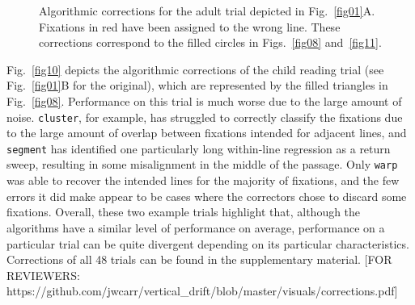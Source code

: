 \documentclass[doc,biblatex]{apa7}
\begin{document}
	\begin{figure}
	\vspace*{2pt}
	\caption{Algorithmic corrections for the adult trial depicted in Fig.~\ref{fig01}A. Fixations in red have been assigned to the wrong line. These corrections correspond to the filled circles in Figs.~\ref{fig08} and~\ref{fig11}.}
	\label{fig09}
	\end{figure}

Fig.~\ref{fig10} depicts the algorithmic corrections of the child reading trial (see Fig.~\ref{fig01}B for the original), which are represented by the filled triangles in Fig.~\ref{fig08}. Performance on this trial is much worse due to the large amount of noise. \texttt{cluster}, for example, has struggled to correctly classify the fixations due to the large amount of overlap between fixations intended for adjacent lines, and \texttt{segment} has identified one particularly long within-line regression as a return sweep, resulting in some misalignment in the middle of the passage. Only \texttt{warp} was able to recover the intended lines for the majority of fixations, and the few errors it did make appear to be cases where the correctors chose to discard some fixations. Overall, these two example trials highlight that, although the algorithms have a similar level of performance on average, performance on a particular trial can be quite divergent depending on its particular characteristics. Corrections of all 48 trials can be found in the supplementary material. [FOR REVIEWERS: https://github.com/jwcarr/vertical\_drift/blob/master/visuals/corrections.pdf]
\end{document}
